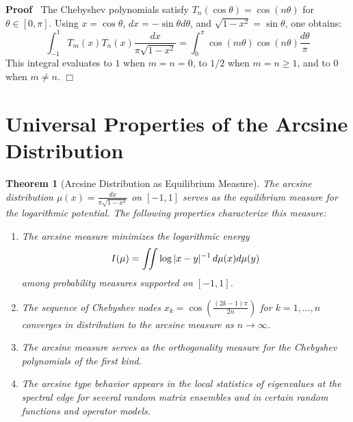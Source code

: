 \documentclass{article}
\newenvironment{proof}{\noindent\textbf{Proof\ }}{\hspace*{\fill}$\Box$\medskip}
\newtheorem{theorem}{Theorem}
\begin{document}
\begin{proof}
  The Chebyshev polynomials satisfy $T_n (\cos \theta) = \cos (n \theta)$ for
  $\theta \in [0, \pi]$. Using $x = \cos \theta$, $dx = - \sin \theta d
  \theta$, and $\sqrt{1 - x^2} = \sin \theta$, one obtains:
  \begin{equation}
    \int_{- 1}^1 T_m (x) T_n (x) \frac{dx}{\pi \sqrt{1 - x^2}} = \int_0^{\pi}
    \cos (m \theta) \cos (n \theta) \frac{d \theta}{\pi}
  \end{equation}
  This integral evaluates to $1$ when $m = n = 0$, to $1 / 2$ when $m = n \geq
  1$, and to $0$ when $m \neq n$.
\end{proof}

\section{Universal Properties of the Arcsine Distribution}

\begin{theorem}
  [Arcsine Distribution as Equilibrium Measure] The arcsine distribution $\mu
  (x) = \frac{dx}{\pi \sqrt{1 - x^2}}$ on $[- 1, 1]$ serves as the equilibrium
  measure for the logarithmic potential. The following properties characterize
  this measure:
  \begin{enumerate}
    \item The arcsine measure minimizes the logarithmic energy
    \begin{equation}
      I (\mu) = \iint \log |x - y|^{- 1}  \hspace{0.17em} d \mu (x) d \mu (y)
    \end{equation}
    among probability measures supported on $[- 1, 1]$.
    
    \item The sequence of Chebyshev nodes $x_k = \cos \left( \frac{(2 k - 1)
    \pi}{2 n} \right)$ for $k = 1, \ldots, n$ converges in distribution to the
    arcsine measure as $n \to \infty$.
    
    \item The arcsine measure serves as the orthogonality measure for the
    Chebyshev polynomials of the first kind.
    
    \item The arcsine type behavior appears in the local statistics of
    eigenvalues at the spectral edge for several random matrix ensembles and
    in certain random functions and operator models.
  \end{enumerate}
\end{theorem}
\end{document}

